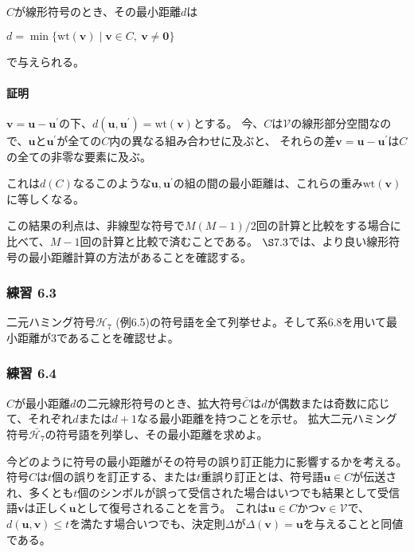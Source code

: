 \documentclass[12pt,a4paper]{article}
\begin{document}
$C$が線形符号のとき、その最小距離$d$は

$d = \min \lbrace \text{wt} (\mathbf{v}) \mid \mathbf{v} \in C , \ \mathbf{v} \neq \mathbf{0} \rbrace$

で与えられる。

\paragraph{証明}\label{ux8a3cux660e}

$\mathbf{v} = \mathbf{u} - \mathbf{u}^\prime$の下、$d(\mathbf{u}, \mathbf{u}^\prime) = \text{wt} (\mathbf{v})$とする。
今、$C$は$\mathcal{V}$の線形部分空間なので、$\mathbf{u}$と$\mathbf{u}^\prime$が全ての$C$内の異なる組み合わせに及ぶと、
それらの差$\mathbf{v} = \mathbf{u} - \mathbf{u}^\prime$は$C$の全ての非零な要素に及ぶ。

これは$d(C)$なるこのような$\mathbf{u}, \mathbf{u}^\prime$の組の間の最小距離は、これらの重み$\text{wt} (\mathbf{v})$に等しくなる。

この結果の利点は、非線型な符号で$M(M-1)/2$回の計算と比較をする場合に比べて、$M-1$回の計算と比較で済むことである。
$\S \text{7.3}$では、より良い線形符号の最小距離計算の方法があることを確認する。

\subsubsection*{練習 6.3}\label{ux7df4ux7fd2-6.3}

二元ハミング符号$\mathcal{H}_7$ (例6.5)の符号語を全て列挙せよ。そして系6.8を用いて最小距離が3であることを確認せよ。

\subsubsection*{練習 6.4}\label{ux7df4ux7fd2-6.4}

$C$が最小距離$d$の二元線形符号のとき、拡大符号$\bar{C}$は$d$が偶数または奇数に応じて、それぞれ$d$または$d + 1$なる最小距離を持つことを示せ。
拡大二元ハミング符号$\bar{\mathcal{H}_7}$の符号語を列挙し、その最小距離を求めよ。

今どのように符号の最小距離がその符号の誤り訂正能力に影響するかを考える。
符号$C$は$t$個の誤りを訂正する、または$t$重誤り訂正とは、符号語$\mathbf{u} \in C$が伝送され、多くとも$t$個のシンボルが誤って受信された場合はいつでも結果として受信語$\mathbf{v}$は正しく$\mathbf{u}$として復号されることを言う。
これは$\mathbf{u} \in C$かつ$\mathbf{v} \in \mathcal{V}$で、$d(\mathbf{u}, \mathbf{v}) \leq t$を満たす場合いつでも、決定則$\Delta$が$\Delta (\mathbf{v}) = \mathbf{u}$を与えることと同値である。
\end{document}
